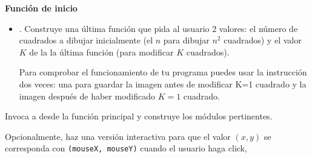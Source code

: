 {\bf Función de inicio}
\begin{itemize}
\item {}. Construye una última función que pida al usuario 2 valores: el número de cuadrados a dibujar inicialmente (el $n$ para dibujar $n^2$ cuadrados) y el valor $K$ de la  la última función (para modificar $K$ cuadrados).

Para comprobar el funcionamiento de tu programa puedes usar la instrucción  dos veces: una para guardar la imagen antes de modificar K=1 cuadrado y la imagen después de haber modificado $K=1$ cuadrado.
\end{itemize}

Invoca a  desde la función principal y construye los módulos pertinentes.

Opcionalmente, haz una versión interactiva para que el valor $(x, y)$ se corresponda con {\tt (mouseX, mouseY)} cuando el usuario haga click,






%
%
%
%
%
%



